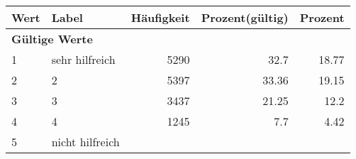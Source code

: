      \begin{longtable}{lXrrr}
     \toprule
     \textbf{Wert} & \textbf{Label} & \textbf{Häufigkeit} & \textbf{Prozent(gültig)} & \textbf{Prozent} \\
     \endhead
     \midrule
     \multicolumn{5}{l}{\textbf{Gültige Werte}}\\

     1 &
     \multicolumn{1}{X}{ sehr hilfreich   } &


       \num{5290} &
       \num[round-mode=places,round-precision=2]{32.7} &
         \num[round-mode=places,round-precision=2]{18.77} \\

     2 &
     \multicolumn{1}{X}{ 2   } &


       \num{5397} &
       \num[round-mode=places,round-precision=2]{33.36} &
         \num[round-mode=places,round-precision=2]{19.15} \\

     3 &
     \multicolumn{1}{X}{ 3   } &


       \num{3437} &
       \num[round-mode=places,round-precision=2]{21.25} &
         \num[round-mode=places,round-precision=2]{12.2} \\

     4 &
     \multicolumn{1}{X}{ 4   } &


       \num{1245} &
       \num[round-mode=places,round-precision=2]{7.7} &
         \num[round-mode=places,round-precision=2]{4.42} \\

     5 &
     \multicolumn{1}{X}{ nicht hilfreich   } &



\end{longtable}
